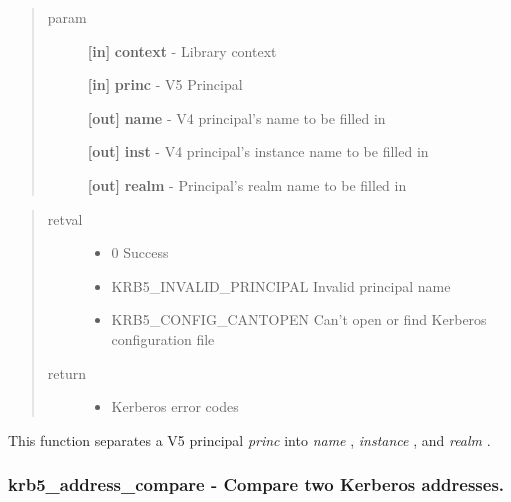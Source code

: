 \documentclass[letterpaper,10pt,english]{sphinxmanual}
\begin{document}
\begin{quote}\begin{description}
\item[{param}] \leavevmode
\textbf{{[}in{]}} \textbf{context} - Library context

\textbf{{[}in{]}} \textbf{princ} - V5 Principal

\textbf{{[}out{]}} \textbf{name} - V4 principal's name to be filled in

\textbf{{[}out{]}} \textbf{inst} - V4 principal's instance name to be filled in

\textbf{{[}out{]}} \textbf{realm} - Principal's realm name to be filled in

\end{description}\end{quote}
\begin{quote}\begin{description}
\item[{retval}] \leavevmode\begin{itemize}
\item {} 
0   Success

\item {} 
KRB5\_INVALID\_PRINCIPAL   Invalid principal name

\item {} 
KRB5\_CONFIG\_CANTOPEN   Can't open or find Kerberos configuration file

\end{itemize}

\item[{return}] \leavevmode\begin{itemize}
\item {} 
Kerberos error codes

\end{itemize}

\end{description}\end{quote}

This function separates a V5 principal \emph{princ} into \emph{name} , \emph{instance} , and \emph{realm} .


\subsubsection{krb5\_address\_compare -  Compare two Kerberos addresses.}
\label{appdev/refs/api/krb5_address_compare:krb5-address-compare-compare-two-kerberos-addresses}\label{appdev/refs/api/krb5_address_compare::doc}
\end{document}
